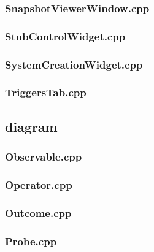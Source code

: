 \subsubsection*{SnapshotViewerWindow.cpp}


\subsubsection*{StubControlWidget.cpp}


\subsubsection*{SystemCreationWidget.cpp}


\subsubsection*{TriggersTab.cpp}


\subsection*{diagram}

\subsubsection*{Observable.cpp}


\subsubsection*{Operator.cpp}


\subsubsection*{Outcome.cpp}


\subsubsection*{Probe.cpp}


